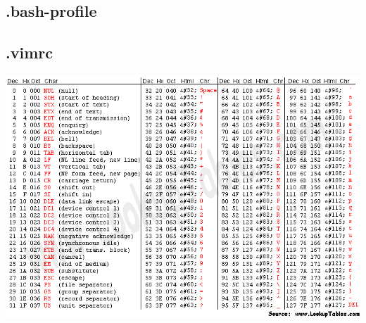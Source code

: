 \documentclass[a4paper]{article}
\begin{document}
\begin{multicols*}{2}
    \subsection{.bash-profile}
        
    \subsection{.vimrc}
        
    \includegraphics[width=\linewidth]{../other/asciifull.png}

\end{multicols*}
\end{document}
